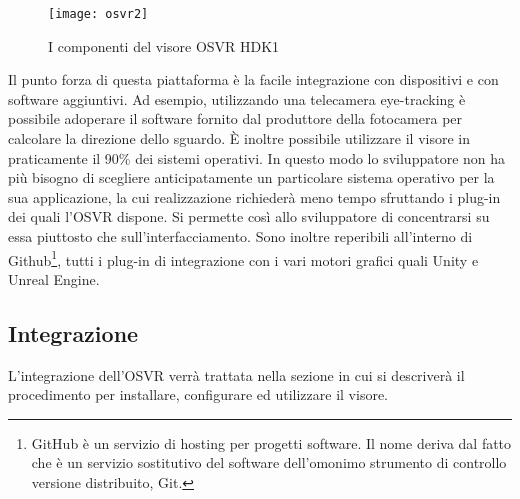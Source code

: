  \begin{figure}[htb]
    \centering
    \texttt{[image: osvr2]}
    \caption{I componenti del visore OSVR HDK1\label{fig:osvr2}}
\end{figure}
\noindent Il punto forza di questa piattaforma è la facile integrazione con dispositivi e con software aggiuntivi. Ad esempio, utilizzando una telecamera eye-tracking è possibile adoperare il software fornito dal produttore della fotocamera per calcolare la direzione dello sguardo. È inoltre possibile utilizzare il visore in praticamente il 90\% dei sistemi operativi.
In questo modo lo sviluppatore non ha più bisogno di scegliere anticipatamente un particolare sistema operativo per la sua applicazione, la cui realizzazione richiederà meno tempo sfruttando i plug-in dei quali l'OSVR dispone. Si permette così allo sviluppatore di concentrarsi su essa piuttosto che sull'interfacciamento.
 Sono inoltre reperibili all'interno di Github\footnote{GitHub è un servizio di hosting per progetti software. Il nome deriva dal fatto che è un servizio sostitutivo del software dell'omonimo strumento di controllo versione distribuito, Git.}, tutti i plug-in di integrazione con i vari motori grafici quali Unity e Unreal Engine.
\subsection{Integrazione}
L'integrazione dell'OSVR verrà trattata nella sezione \textit{} in cui si descriverà il procedimento per installare, configurare ed utilizzare il visore.